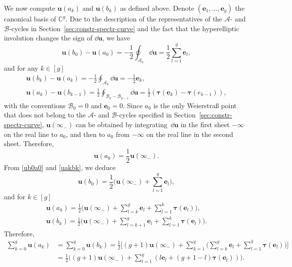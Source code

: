 \documentclass[10pt,a4paper]{amsart}
\numberwithin{equation}{section}
\begin{document}
We now compute $\bm{u}(a_k)$ and $\bm{u}(b_k)$ as defined above. Denote $(\bm{e}_1,\ldots,\bm{e}_g)$ the canonical basis of $\mathbb{C}^g$. Due to the description of the representatives of the $\mathcal{A}$- and $\mathcal{B}$-cycles in Section~\ref{sec:constr-spectr-curve} and the fact that the hyperelliptic involution changes the sign of $\dd \bm{u}$, we have
\begin{equation}
\label{ub0a0}
\bm{u}(b_0) - \bm{u}(a_0) = - \frac{1}{2} \oint_{\mathcal{A}_0} \dd \bm{u} = \frac{1}{2} \sum_{l = 1}^{g} \bm{e}_l,
\end{equation}
and for any $k \in [g]$
\begin{gather}
\bm{u}(b_k) - \bm{u}(a_k)  = - \frac{1}{2} \oint_{\mathcal{A}_k} \dd \bm{u} = -\frac{1}{2}\bm{e}_k, \nonumber\\
\bm{u}(a_k) - \bm{u}(b_{k - 1})  = \frac{1}{2} \oint_{\mathcal{B}_{k} - \mathcal{B}_{k - 1}} \dd \bm{u} = \frac{1}{2} (\bm{\tau}(\bm{e}_k) - \bm{\tau}(e_{k - 1})), \label{uakbk}
\end{gather}
with the conventions $\mathcal{B}_0 = 0$ and $\bm{e}_0 = 0$. Since $a_0$ is the only Weierstra\ss{} point that does not belong to the $\mathcal{A}$- and $\mathcal{B}$-cycles specified in Section~\ref{sec:constr-spectr-curve}, $\bm{u}(\infty_-)$ can be obtained by integrating~$\dd \bm{u}$ in the first sheet $-\infty$ on the real line to $a_0$, and then to $a_0$ from $-\infty$ on the real line in the second sheet. Therefore,
\[
\bm{u}(a_0) = \frac{1}{2} \bm{u}(\infty_-).
\]
From \eqref{ub0a0} and \eqref{uakbk}, we deduce
\[
\bm{u}(b_0) = \frac{1}{2}\Biggl(\bm{u}(\infty_-) + \sum_{l = 1}^g \bm{e}_l\Biggr),
\]
and for $k \in [g]$
\begin{gather*}
\bm{u}(a_k) = \frac{1}{2}\Biggl(\bm{u}(\infty_-) + \sum_{l = k}^{g} \bm{e}_l + \sum_{l = 1}^{k} \bm{\tau}(\bm{e}_l)\Biggr), \\
\bm{u}(b_k) = \frac{1}{2}\Biggl(\bm{u}(\infty_-) + \sum_{l= k + 1}^{g} \bm{e}_l + \sum_{l = 1}^{k} \bm{\tau}(\bm{e}_l)\Biggr).
\end{gather*}
Therefore,
\begin{align*}
\sum_{k = 0}^{g} \bm{u}(a_k) &{} = \sum_{k = 0}^{g} \bm{u}(b_k) = \frac{1}{2}\Biggl[(g + 1)\bm{u}(\infty_-) + \sum_{k = 1}^{g}\Biggl( \sum_{l = k}^{g} \bm{e}_l + \sum_{l = 1}^k \bm{\tau}(\bm{e}_l)\Biggr)\Biggr] \\
 &{} = \frac{1}{2}\Biggl((g + 1)\bm{u}(\infty_-) + \sum_{l = 1}^{g} (l \bm{e}_l + (g + 1 -l)\bm{\tau}(\bm{e}_l))\Biggr).
\end{align*}
\end{document}

